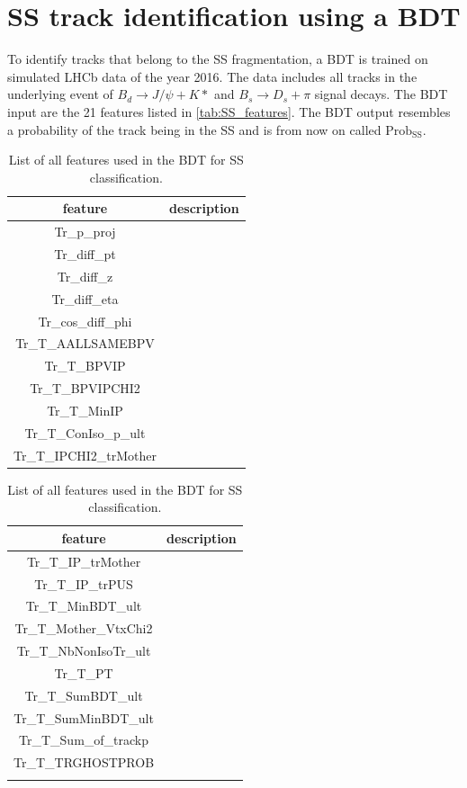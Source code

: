 \section{SS track identification using a BDT}

To identify tracks that belong to the SS fragmentation, a BDT is trained on simulated LHCb data of the year 2016.
The data includes all tracks in the underlying event of $B_d \rightarrow J/\psi + K*$ and $B_s \rightarrow D_s + \pi$ signal decays.
The BDT input are the 21 features listed in \autoref{tab:SS_features}.
The BDT output resembles a probability of the track being in the SS and is from now on called $\text{Prob}_\text{SS}$.

\begin{table}
    \centering
    \caption{List of all features used in the BDT for SS classification.}
    \label{tab:SS_features}
    \begin{tabular}{c c}
        \toprule
        feature & description \\
        \midrule
        Tr\_p\_proj &  \\
        Tr\_diff\_pt &  \\
        Tr\_diff\_z &  \\
        Tr\_diff\_eta &  \\
        Tr\_cos\_diff\_phi &  \\
        Tr\_T\_AALLSAMEBPV &  \\
        Tr\_T\_BPVIP &  \\
        Tr\_T\_BPVIPCHI2 &  \\
        Tr\_T\_MinIP &  \\
        Tr\_T\_ConIso\_p\_ult &  \\
        Tr\_T\_IPCHI2\_trMother &  \\
        \bottomrule
    \end{tabular}
    \begin{tabular}{c c}
        \toprule
        feature & description \\
        \midrule
        Tr\_T\_IP\_trMother &  \\
        Tr\_T\_IP\_trPUS &  \\
        Tr\_T\_MinBDT\_ult &  \\
        Tr\_T\_Mother\_VtxChi2 &  \\
        Tr\_T\_NbNonIsoTr\_ult &  \\
        Tr\_T\_PT &  \\
        Tr\_T\_SumBDT\_ult &  \\
        Tr\_T\_SumMinBDT\_ult &  \\
        Tr\_T\_Sum\_of\_trackp &  \\
        Tr\_T\_TRGHOSTPROB &  \\
        & \\
        \bottomrule
    \end{tabular}
\end{table}

